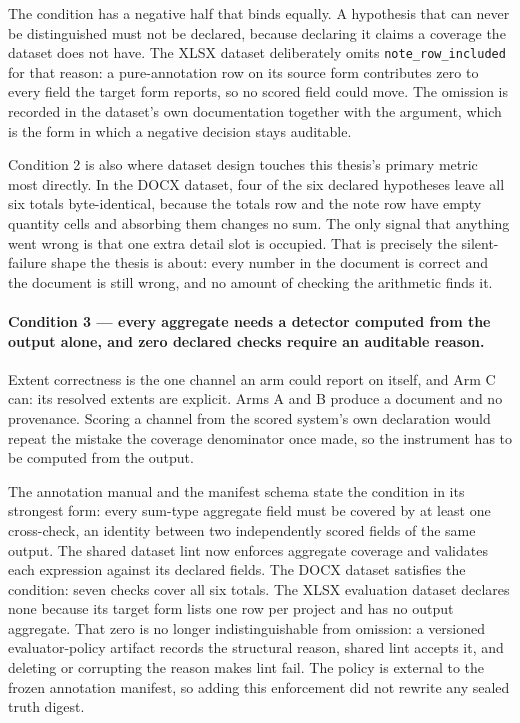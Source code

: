 The condition has a negative half that binds equally. A hypothesis that can never be
distinguished must not be declared, because declaring it claims a coverage the dataset does not
have. The XLSX dataset deliberately omits \texttt{note\_row\_included} for that reason: a
pure-annotation row on its source form contributes zero to every field the target form reports,
so no scored field could move. The omission is recorded in the dataset's own documentation
together with the argument, which is the form in which a negative decision stays auditable.

Condition 2 is also where dataset design touches this thesis's primary metric most directly. In
the DOCX dataset, four of the six declared hypotheses leave all six totals byte-identical,
because the totals row and the note row have empty quantity cells and absorbing them changes no
sum. The only signal that anything went wrong is that one extra detail slot is occupied. That
is precisely the silent-failure shape the thesis is about: every number in the document is
correct and the document is still wrong, and no amount of checking the arithmetic finds it.

\paragraph{Condition 3 --- every aggregate needs a detector computed from the output alone, and
zero declared checks require an auditable reason.}
Extent correctness is the one channel an arm could report on itself, and Arm C can: its
resolved extents are explicit. Arms A and B produce a document and no provenance. Scoring a
channel from the scored system's own declaration would repeat the mistake the coverage
denominator once made, so the instrument has to be computed from the output.

The annotation manual and the manifest schema state the condition in its strongest form: every
sum-type aggregate field must be covered by at least one cross-check, an identity between two
independently scored fields of the same output. The shared dataset lint now enforces aggregate
coverage and validates each expression against its declared fields. The DOCX dataset satisfies
the condition: seven checks cover all six totals. The XLSX evaluation dataset declares none
because its target form lists one row per project and has no output aggregate. That zero is no
longer indistinguishable from omission: a versioned evaluator-policy artifact records the
structural reason, shared lint accepts it, and deleting or corrupting the reason makes lint fail.
The policy is external to the frozen annotation manifest, so adding this enforcement did not
rewrite any sealed truth digest.

